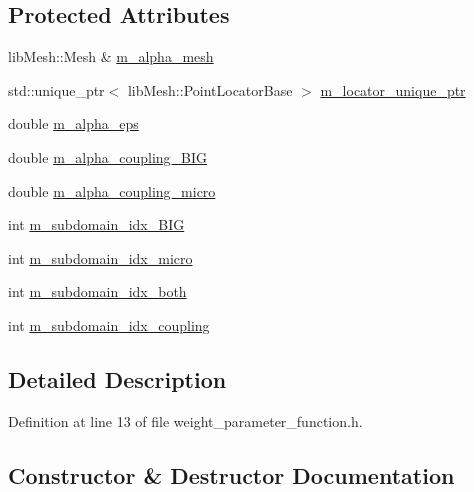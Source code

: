 \subsection*{Protected Attributes}
\begin{DoxyCompactItemize}
\item 
lib\+Mesh\+::\+Mesh \& \hyperlink{classweight__parameter__function_a391a5a229d29fd746e352af0ec804495}{m\+\_\+alpha\+\_\+mesh}
\item 
std\+::unique\+\_\+ptr$<$ lib\+Mesh\+::\+Point\+Locator\+Base $>$ \hyperlink{classweight__parameter__function_ae37938d69363743baba5797c599e0640}{m\+\_\+locator\+\_\+unique\+\_\+ptr}
\item 
double \hyperlink{classweight__parameter__function_a6ad313072643dbac787120791eeeac26}{m\+\_\+alpha\+\_\+eps}
\item 
double \hyperlink{classweight__parameter__function_a47850e20883c96b524fc322ea5cbc82e}{m\+\_\+alpha\+\_\+coupling\+\_\+\+B\+I\+G}
\item 
double \hyperlink{classweight__parameter__function_a2136698edf313c3d9250027b07cfeb52}{m\+\_\+alpha\+\_\+coupling\+\_\+micro}
\item 
int \hyperlink{classweight__parameter__function_a1d22b2e8b9faff31c8fa0ef2161144e5}{m\+\_\+subdomain\+\_\+idx\+\_\+\+B\+I\+G}
\item 
int \hyperlink{classweight__parameter__function_a21eb1aebdae4706322cb17982c931eef}{m\+\_\+subdomain\+\_\+idx\+\_\+micro}
\item 
int \hyperlink{classweight__parameter__function_a0e5865143597a2ce9a19acaaa37a5bca}{m\+\_\+subdomain\+\_\+idx\+\_\+both}
\item 
int \hyperlink{classweight__parameter__function_a516c68be83fc9cdc80c8bf4aecf395a4}{m\+\_\+subdomain\+\_\+idx\+\_\+coupling}
\end{DoxyCompactItemize}


\subsection{Detailed Description}


Definition at line 13 of file weight\+\_\+parameter\+\_\+function.\+h.



\subsection{Constructor \& Destructor Documentation}
\hypertarget{classweight__parameter__function_ae7dc955ca3080fc45818db02d57798ad}{}
